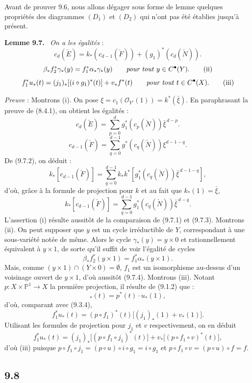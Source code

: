 \documentclass[11pt]{article}
\newenvironment{statement}[1]{\par\medskip\noindent\textbf{#1.}\ }{\par\medskip}
\begin{document}
Avant de prouver 9.6, nous allons dégager sous forme de lemme quelques propriétés des diagrammes $(D_1)$ et $(D_2)$ qui n'ont pas été établies jusqu'à présent.

\begin{statement}{Lemme 9.7}
\emph{On a les égalités} :
\[
c_d(\check E)=k_*(c_{d-1}(\check F))+(g_1)^*(c_d(\check N)).
\tag{i}
\]
\[
\beta_*f_2^*\gamma_*(y)=f_1^*\alpha_*\gamma_*(y)\qquad\text{\emph{pour tout} }y\in C^{\bullet}(Y).
\tag{ii}
\]
\[
f_1^*u_*(t)=(j_1)_*[(i\circ g_1)^*(t)]+v_*f^*(t)\qquad\text{\emph{pour tout} }t\in C^{\bullet}(X).
\tag{iii}
\]
\end{statement}

\emph{Preuve} : Montrons (i). On pose $\xi=c_1(\mathcal O_{Y'}(1))=k^*(\bar\xi)$. En paraphrasant la preuve de (8.4.1), on
obtient les égalités :
\[
c_d(\check E)=\sum_{p=0}^d g_1^*(c_p(\check N))\bar\xi^{\,d-p}.
\tag{9.7.1}
\]
\[
c_{d-1}(\check F)=\sum_{q=0}^{d-1}g^*(c_q(\check N))\xi^{d-1-q}.
\tag{9.7.2}
\]
De (9.7.2), on déduit :
\[
k_*[c_{d-1}(\check F)]
=\sum_{q=0}^{d-1}k_*k^*[g_1^*(c_q(\check N))\bar\xi^{\,d-1-q}],
\]
d'où, grâce à la formule de projection pour $k$ et au fait que $k_*(1)=\bar\xi$,
\[
k_*[c_{d-1}(\check F)]=\sum_{q=0}^{d-1}g_1^*(c_q(\check N))\bar\xi^{\,d-q}.
\tag{9.7.3}
\]
L'assertion (i) résulte aussitôt de la comparaison de (9.7.1) et (9.7.3). Montrons (ii). On peut supposer que $y$ est un cycle irréductible de $Y$, correspondant à une sous-variété notée de même. Alors le cycle $\gamma_*(y)=y\times0$ et rationnellement équivalent à $y\times1$, de sorte qu'il suffit de voir l'égalité de cycles
\[
\beta_*f_2^*(y\times1)=f_1^*\alpha_*(y\times1).
\tag{9.7.4}
\]
Mais, comme $(y\times1)\cap(Y\times0)=\emptyset$, $f_1$ est un isomorphisme au-dessus d'un voisinage ouvert de $y\times1$, d'où aussitôt (9.7.4). Montrons (iii). Notant $p:X\times\mathbb P^1\to X$ la première projection, il résulte de (9.1.2) que :
\[
{}_*(t)=p^*(t)\cdot u_*(1),
\tag{9.7.5}
\]
d'où, comparant avec (9.3.4),
\[
f_1^*u_*(t)=(p\circ f_1)^*(t)\bigl[(j_1)_*(1)+v_*(1)\bigr].
\tag{9.7.6}
\]
Utilisant les formules de projection pour $j_1$ et $v$ respectivement, on en déduit
\[
f_1^*u_*(t)=(j_1)_*\bigl[(p\circ f_1\circ j_1)^*(t)\bigr]+v_*\bigl[(p\circ f_1\circ v)^*(t)\bigr],
\tag{9.7.7}
\]
d'où (iii) puisque $p\circ f_1\circ j_1=(p\circ u)\circ i\circ g_1=i\circ g_1$ et $p\circ f_1\circ v=(p\circ u)\circ f=f$.

\subsection*{9.8}
\end{document}
